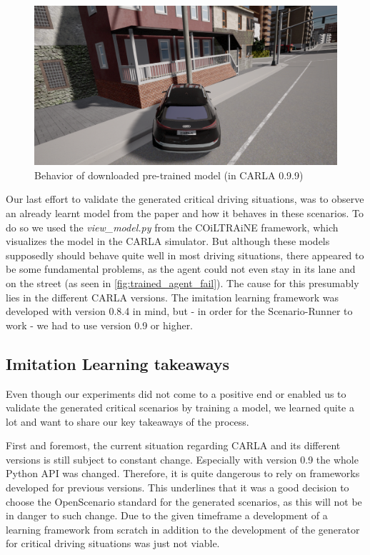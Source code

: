 \documentclass[conference, a4paper, 11pt]{IEEEtran}
\begin{document}
\begin{figure}[ht]
    \centering
    \includegraphics[width=0.9\linewidth]{figures/trained_agent_fail.png}
    \caption{Behavior of downloaded pre-trained model (in CARLA 0.9.9)}
    \label{fig:trained_agent_fail}
\end{figure}

Our last effort to validate the generated critical driving situations, was to observe an already learnt model from the paper  \cite{Codevilla:OnOfflineEvaluation} and how it behaves in these scenarios. To do so we used the \textit{view\_model.py} from the COiLTRAiNE framework, which visualizes the model in the CARLA simulator. But although these models supposedly should behave quite well in most driving situations, there appeared to be some fundamental problems, as the agent could not even stay in its lane and on the street (as seen in \autoref{fig:trained_agent_fail}). The cause for this presumably lies in the different CARLA versions. The imitation learning framework was developed with version 0.8.4 in mind, but - in order for the Scenario-Runner to work - we had to use version 0.9 or higher.

\subsection{Imitation Learning takeaways}

Even though our experiments did not come to a positive end or enabled us to validate the generated critical scenarios by training a model, we learned quite a lot and want to share our key takeaways of the process.

First and foremost, the current situation regarding CARLA and its different versions is still subject to constant change. Especially with version 0.9 the whole Python API was changed. Therefore, it is quite dangerous to rely on frameworks developed for previous versions. This underlines that it was a good decision to choose the OpenScenario standard for the generated scenarios, as this will not be in danger to such change.
Due to the given timeframe a development of a learning framework from scratch in addition to the development of the generator for critical driving situations was just not viable.
\end{document}
